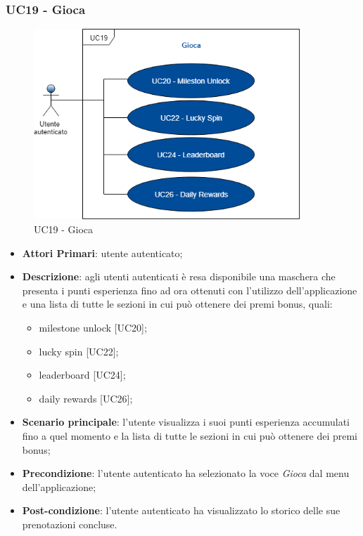\subsubsection{UC19 - Gioca}
 \begin{figure}[h]
	\includegraphics[width=10cm]{res/images/UC19Gioca.png}
	\centering
	\caption{UC19 - Gioca}
\end{figure}
\begin{itemize}
	\item \textbf{Attori Primari}: utente autenticato;
	\item \textbf{Descrizione}: agli utenti autenticati è resa disponibile una maschera che presenta i punti esperienza fino ad ora ottenuti con l'utilizzo dell'applicazione e una lista di tutte le sezioni in cui può ottenere dei premi bonus, quali:
	\begin{itemize}
		\item milestone unlock [UC20];
		\item lucky spin [UC22];
		\item leaderboard [UC24];
		\item daily rewards [UC26];
	\end{itemize} 
	\item \textbf{Scenario principale}: l'utente visualizza i suoi punti esperienza accumulati fino a quel momento e la lista di tutte le sezioni in cui può ottenere dei premi bonus;
	\item \textbf{Precondizione}: l'utente autenticato ha selezionato la voce \textit{Gioca} dal menu dell'applicazione;
	\item \textbf{Post-condizione}: l'utente autenticato ha visualizzato lo storico delle sue prenotazioni concluse. 
\end{itemize} 
